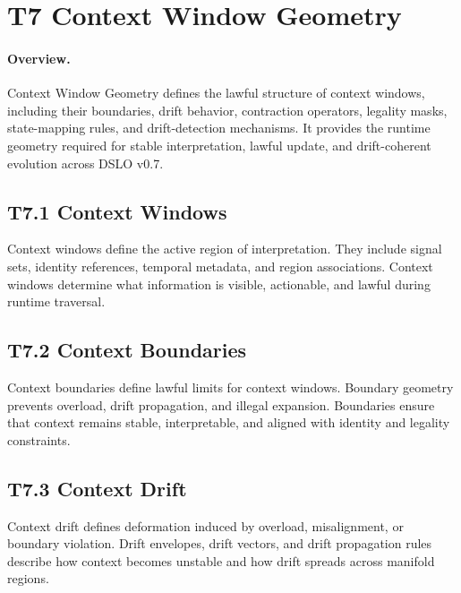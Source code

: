 
\section{T7 Context Window Geometry}

\paragraph{Overview.}
Context Window Geometry defines the lawful structure of context windows,
including their boundaries, drift behavior, contraction operators, legality
masks, state-mapping rules, and drift-detection mechanisms. It provides the
runtime geometry required for stable interpretation, lawful update, and
drift-coherent evolution across DSLO v0.7.

\subsection{T7.1 Context Windows}
Context windows define the active region of interpretation. They include signal
sets, identity references, temporal metadata, and region associations. Context
windows determine what information is visible, actionable, and lawful during
runtime traversal.

\subsection{T7.2 Context Boundaries}
Context boundaries define lawful limits for context windows. Boundary geometry
prevents overload, drift propagation, and illegal expansion. Boundaries ensure
that context remains stable, interpretable, and aligned with identity and
legality constraints.

\subsection{T7.3 Context Drift}
Context drift defines deformation induced by overload, misalignment, or
boundary violation. Drift envelopes, drift vectors, and drift propagation rules
describe how context becomes unstable and how drift spreads across manifold
regions.

